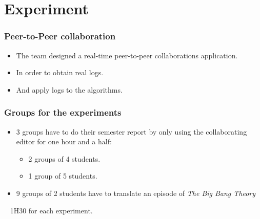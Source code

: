 \documentclass[14pt]{beamer}
\begin{document}
\section{Experiment}
	\begin{frame}
		\frametitle{Peer-to-Peer collaboration}
		\begin{itemize}
			\item The team designed a real-time peer-to-peer collaborations application.
			\item In order to obtain real logs.
			\item And apply logs to the algorithms.
		\end{itemize}
	\end{frame}
	\begin{frame}
		\frametitle{Groups for the experiments}
		\begin{itemize}
	\item 3 groups have to do their semester report by only using the collaborating editor for one hour and a half:
		\begin{itemize}
			\item 2 groups of 4 students.
			\item 1 group of 5 students.
		\end{itemize}
	\item 9 groups of 2 students have to translate an episode of \emph{The Big Bang Theory}
	\end{itemize}~
	1H30 for each experiment.
	\end{frame}
\end{document}
